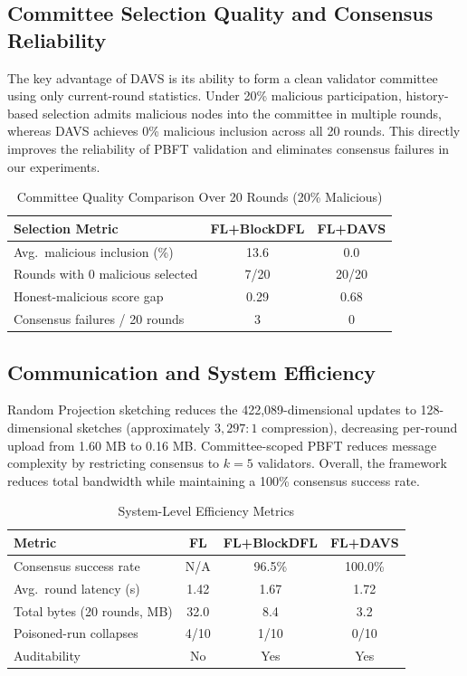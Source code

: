 \subsection{Committee Selection Quality and Consensus Reliability}
The key advantage of DAVS is its ability to form a clean validator committee using only current-round statistics. Under 20\% malicious participation, history-based selection admits malicious nodes into the committee in multiple rounds, whereas DAVS achieves 0\% malicious inclusion across all 20 rounds. This directly improves the reliability of PBFT validation and eliminates consensus failures in our experiments.

\begin{table}[h]
\centering
\caption{Committee Quality Comparison Over 20 Rounds (20\% Malicious)}
\begin{tabular}{|l|c|c|}
\hline
\textbf{Selection Metric} & \textbf{FL+BlockDFL} & \textbf{FL+DAVS} \\
\hline
Avg.\ malicious inclusion (\%) & 13.6 & 0.0 \\
Rounds with 0 malicious selected & 7/20 & 20/20 \\
Honest-malicious score gap & 0.29 & 0.68 \\
Consensus failures / 20 rounds & 3 & 0 \\
\hline
\end{tabular}
\label{tab:committee_quality_ch8}
\end{table}

\subsection{Communication and System Efficiency}
Random Projection sketching reduces the 422,089-dimensional updates to 128-dimensional sketches (approximately \(3{,}297{:}1\) compression), decreasing per-round upload from 1.60 MB to 0.16 MB. Committee-scoped PBFT reduces message complexity by restricting consensus to \(k{=}5\) validators. Overall, the framework reduces total bandwidth while maintaining a 100\% consensus success rate.

\begin{table}[h]
\centering
\caption{System-Level Efficiency Metrics}
\begin{tabular}{|l|c|c|c|}
\hline
\textbf{Metric} & \textbf{FL} & \textbf{FL+BlockDFL} & \textbf{FL+DAVS} \\
\hline
Consensus success rate & N/A & 96.5\% & 100.0\% \\
Avg.\ round latency (s) & 1.42 & 1.67 & 1.72 \\
Total bytes (20 rounds, MB) & 32.0 & 8.4 & 3.2 \\
Poisoned-run collapses & 4/10 & 1/10 & 0/10 \\
Auditability & No & Yes & Yes \\
\hline
\end{tabular}
\label{tab:efficiency_ch8}
\end{table}

